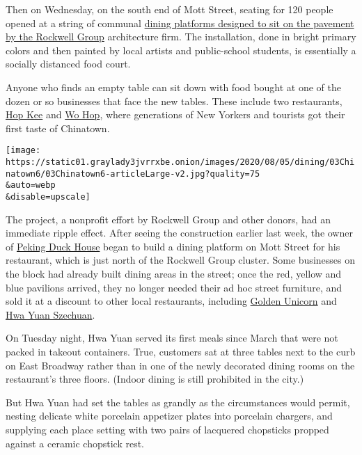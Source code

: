 Then on Wednesday, on the south end of Mott Street, seating for 120
people opened at a string of communal
\href{https://www.rockwellgroup.com/projects/dineout-nyc\#:~:text=Our\%20solution\%2C\%20DineOut\%20NYC\%2C\%20designed,to\%20feel\%20safe\%20and\%20comfortable.}{dining
platforms designed to sit on the pavement by the Rockwell Group}
architecture firm. The installation, done in bright primary colors and
then painted by local artists and public-school students, is essentially
a socially distanced food court.

Anyone who finds an empty table can sit down with food bought at one of
the dozen or so businesses that face the new tables. These include two
restaurants, \href{http://www.hop-kee-nyc.com/}{Hop Kee} and
\href{https://www.nytimes3xbfgragh.onion/2010/07/07/dining/reviews/07dinbriefs.html}{Wo
Hop}, where generations of New Yorkers and tourists got their first
taste of Chinatown.

\texttt{[image: https://static01.graylady3jvrrxbe.onion/images/2020/08/05/dining/03Chinatown6/03Chinatown6-articleLarge-v2.jpg?quality=75\\\&auto=webp\\\&disable=upscale]}

The project, a nonprofit effort by Rockwell Group and other donors, had
an immediate ripple effect. After seeing the construction earlier last
week, the owner of \href{https://www.pekingduckhousenyc.com/}{Peking
Duck House} began to build a dining platform on Mott Street for his
restaurant, which is just north of the Rockwell Group cluster. Some
businesses on the block had already built dining areas in the street;
once the red, yellow and blue pavilions arrived, they no longer needed
their ad hoc street furniture, and sold it at a discount to other local
restaurants, including
\href{http://www.goldenunicornrestaurant.com/}{Golden Unicorn} and
\href{https://www.nytimes3xbfgragh.onion/2018/02/13/dining/hwa-yuan-szechuan-review-chinese-food.html}{Hwa
Yuan Szechuan}.

On Tuesday night, Hwa Yuan served its first meals since March that were
not packed in takeout containers. True, customers sat at three tables
next to the curb on East Broadway rather than in one of the newly
decorated dining rooms on the restaurant's three floors. (Indoor dining
is still prohibited in the city.)

But Hwa Yuan had set the tables as grandly as the circumstances would
permit, nesting delicate white porcelain appetizer plates into porcelain
chargers, and supplying each place setting with two pairs of lacquered
chopsticks propped against a ceramic chopstick rest.

